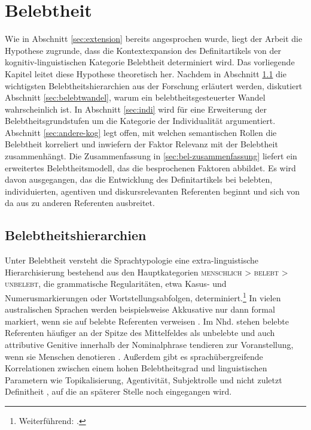 \chapter{Belebtheit} \label{chapter:belebtheit}

Wie in Abschnitt \ref{sec:extension} bereits angesprochen wurde, liegt der Arbeit  die Hypothese zugrunde, dass die Kontextexpansion des Definitartikels von der kognitiv-linguistischen Kategorie Belebtheit determiniert wird. Das vorliegende Kapitel leitet diese Hypothese theoretisch her. Nachdem in Abschnitt \ref{sec:belebt} die wichtigsten Belebtheitshierarchien aus der Forschung erläutert werden, diskutiert Abschnitt \ref{sec:belebtwandel}, warum ein belebtheitsgesteuerter Wandel wahrscheinlich ist. In Abschnitt \ref{sec:indi} wird für eine Erweiterung der Belebtheitsgrundstufen um die Kategorie der Individualität argumentiert. Abschnitt \ref{sec:andere-kog} legt offen, mit welchen semantischen Rollen die Belebtheit korreliert und inwiefern der Faktor Relevanz mit der Belebtheit zusammenhängt. Die Zusammenfassung in \ref{sec:bel-zusammenfassung} liefert ein erweitertes Belebtheitsmodell, das die besprochenen Faktoren abbildet. Es wird davon ausgegangen, das die Entwicklung des Definitartikels bei belebten, individuierten, agentiven und diskursrelevanten Referenten beginnt und sich von da aus zu anderen Referenten ausbreitet. 

\section{Belebtheitshierarchien}\label{sec:belebt}

Unter Belebtheit versteht die Sprachtypologie eine extra-linguistische Hierarchisierung bestehend aus den Hauptkategorien \textsc{menschlich > belebt > unbelebt}, die grammatische Regularitäten, etwa Kasus- und Numerusmarkierungen oder Wortstellungsabfolgen, determiniert.\footnote{Weiterführend:  \cite{Silverstein1976,Allan1987,Comrie1989,Langacker1991,Dahl1996,Yamamoto1999,Yamamoto2006,Croft1995,Croft2006,Dixon1995, Corbett2000,Aissen2003,Zifonun2006, Dahl2008}.} In vielen australischen Sprachen werden beispielsweise Akkusative nur dann formal markiert, wenn sie auf belebte Referenten verweisen \parencite[189]{Comrie1989}. 
Im Nhd. stehen belebte Referenten häufiger an der Spitze des Mittelfeldes als unbelebte \parencite{Kempen2004} und auch attributive Genitive innerhalb der Nominalphrase tendieren zur Voranstellung, wenn sie Menschen denotieren  \parencite{Hartmann2003}. Außerdem gibt es sprachübergreifende Korrelationen zwischen einem hohen Belebtheitsgrad und linguistischen Parametern wie Topikalisierung, Agentivität, Subjektrolle und nicht zuletzt Definitheit \parencite{Comrie1989, Yamamoto2006}, auf die an späterer Stelle noch eingegangen wird. 

